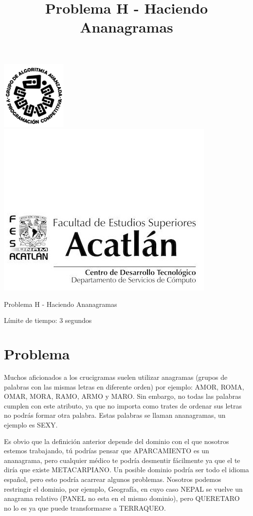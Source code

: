 \documentclass[letter,10pt]{article}
\date{}
\begin{document}
\title{Problema H - Haciendo Ananagramas}

\includegraphics[scale=0.6]{logo} \hspace*{9.00cm}
\includegraphics[scale=0.5]{dsc} 
\bigskip
\begin{center}
	\Large Problema H - Haciendo Ananagramas
\end{center}

\begin{flushright}
Límite de tiempo: 3 segundos
\par\end{flushright}
\bigskip

\section*{Problema}

Muchos aficionados a los crucigramas suelen utilizar 
anagramas (grupos de palabras con las mismas letras en 
diferente orden) por ejemplo: AMOR, ROMA, OMAR, MORA,
RAMO, ARMO y MARO. Sin embargo, no todas las palabras cumplen
con este atributo, ya que no importa como trates de ordenar sus
letras no podrás formar otra palabra. Estas palabras se llaman
ananagramas, un ejemplo es SEXY.

Es obvio que la definición anterior depende del dominio con el
que nosotros estemos trabajando, tú podrías pensar que APARCAMIENTO
es un ananagrama, pero cualquier médico te podría desmentir 
fácilmente  ya que el te diría que existe METACARPIANO. Un posible
dominio podría ser todo el idioma español, pero esto podría acarrear 
algunos problemas. Nosotros podemos restringir el dominio, por ejemplo,
Geografía, en cuyo caso NEPAL se vuelve un anagrama relativo
(PANEL no esta en el mismo dominio), pero QUERETARO no lo es ya que
puede transformarse a TERRAQUEO.
\end{document}
